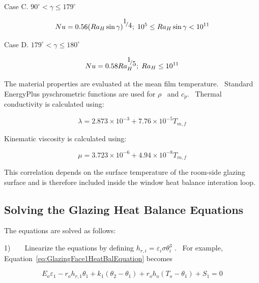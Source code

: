 Case C. \(90^\circ < \gamma \le 179^\circ\)

\begin{equation}
Nu = 0.56{\left( {R{a_H}\sin \gamma } \right)^{{\raise0.7ex\hbox{1} \!\mathord{\left/ {\vphantom {1 4}}\right.}\!\lower0.7ex\hbox{4}}}};\;{10^5} \le R{a_H}\sin \gamma  < {10^{11}}
\end{equation}

Case D. \(179^\circ < \gamma \le 180^\circ\)

\begin{equation}
Nu = 0.58Ra_H^{{\raise0.7ex\hbox{1} \!\mathord{\left/ {\vphantom {1 5}}\right.}\!\lower0.7ex\hbox{5}}};\;R{a_H} \le {10^{11}}
\end{equation}

The material properties are evaluated at the mean film temperature.~ Standard EnergyPlus pyschrometric functions are used for \(\rho\) ~and \({c_p}\).~ Thermal conductivity is calculated using:

\begin{equation}
\lambda = 2.873 \times {10^{ - 3}} + 7.76 \times {10^{ - 5}}{T_{m,f}}
\end{equation}

Kinematic viscosity is calculated using:

\begin{equation}
\mu = 3.723 \times {10^{ - 6}} + 4.94 \times {10^{ - 8}}{T_{m,f}}
\end{equation}

This correlation depends on the surface temperature of the room-side glazing surface and is therefore included inside the window heat balance interation loop.

\subsection{Solving the Glazing Heat Balance Equations}\label{solving-the-glazing-heat-balance-equations}

The equations are solved as follows:

1)~~~~Linearize the equations by defining \({h_{r,i}} = {\varepsilon_i}\sigma \theta_i^3\) .~ For example, Equation~\ref{eq:GlazingFace1HeatBalEquation} becomes

\begin{equation}
{E_o}{\varepsilon_1} - {r_o}{h_{r,1}}{\theta_1} + {k_1}\left( {{\theta_2} - {\theta_1}} \right) + {r_o}{h_o}\left( {{T_o} - {\theta_1}} \right) + {S_1} = 0
\end{equation}

